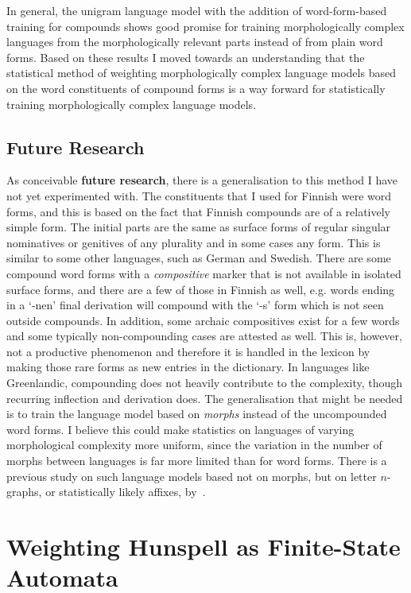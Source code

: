 \documentclass[officiallayout,final]{unihelcompling}
\begin{document}
In general, the unigram language model with the addition of word-form-based
training for compounds shows good promise for training
morphologically complex languages from the morphologically relevant parts
instead of from plain word forms. Based on these results I moved towards an 
understanding that the statistical method of weighting morphologically complex
language models based on the word constituents of compound forms is a way 
forward for statistically training morphologically complex language models.

\subsection{Future Research}

As conceivable \textbf{future research}, there is a generalisation to this
method I have not yet experimented with. The constituents that I used for
Finnish were word forms, and this is based on the fact that Finnish compounds
are of a relatively simple form. The initial parts are the same as surface
forms of regular singular nominatives or genitives of any plurality and in some
cases any form. This is similar to some other languages, such as German and
Swedish.  There are some compound word forms with a \emph{compositive} marker
that is not available in isolated surface forms, and there are a few of those
in Finnish as well, e.g.\/ words ending in a `-nen' final derivation will
compound with the `-s' form which is not seen outside compounds. In addition,
some archaic compositives exist for a few words and some typically
non-compounding cases are attested as well. This is, however, not a productive
phenomenon and therefore it is handled in the lexicon by making those rare
forms as new entries in the dictionary.  In languages like Greenlandic,
compounding does not heavily contribute to the complexity, though recurring
inflection and derivation does. The generalisation that might be needed is to
train the language model based on \emph{morphs} instead of the uncompounded
word forms.  I believe this could make statistics on languages of varying
morphological complexity more uniform, since the variation in the number of
morphs between languages is far more limited than for word forms. There is a
previous study on such language models based not on morphs, but on letter
\(n\)-graphs, or statistically likely affixes, by~\citet{creutz2005morfessor}.


\section{Weighting Hunspell as Finite-State Automata}
\label{sec:hunspell-training}
\end{document}
